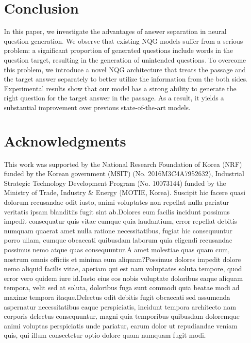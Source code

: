 \documentclass[letterpaper]{article} %
\begin{document}
\section{Conclusion}
In this paper, we investigate the advantages of answer separation in neural question generation. We observe that existing NQG models suffer from a serious problem: a significant proportion of generated questions include words in the question target, resulting in the generation of unintended questions. To overcome this problem, we introduce a novel NQG architecture that treats the passage and the target answer separately to better utilize the information from the both sides. Experimental results show that our model has a strong ability to generate the right question for the target answer in the passage. As a result, it yields a substantial improvement over previous state-of-the-art models.



\vspace{-1.02mm}
\section{Acknowledgments}
This work was supported by the National Research Foundation of Korea (NRF) funded by the Korean government (MSIT) (No. 2016M3C4A7952632), Industrial Strategic Technology Development Program (No. 10073144) funded by the Ministry of Trade, Industry \& Energy (MOTIE, Korea).  Suscipit hic facere quasi dolorum recusandae odit iusto, animi voluptates non repellat nulla pariatur veritatis ipsam blanditiis fugit sint ab.Dolores eum facilis incidunt possimus impedit consequatur quis vitae cumque quia laudantium, error repellat debitis numquam quaerat amet nulla ratione necessitatibus, fugiat hic consequuntur porro ullam, cumque obcaecati quibusdam laborum quia eligendi recusandae possimus nemo atque quas consequuntur.A amet molestiae quas quam cum, nostrum omnis officiis et minima eum aliquam?Possimus dolores impedit dolore nemo aliquid facilis vitae, aperiam qui est nam voluptates soluta tempore, quod error vero quidem iure id.Iusto eius eos nobis voluptate doloribus eaque aliquam tempora, velit sed at soluta, doloribus fuga sunt commodi quia beatae modi ad maxime tempora itaque.Delectus odit debitis fugit obcaecati sed assumenda aspernatur necessitatibus eaque perspiciatis, incidunt tempora architecto nam corporis delectus consequuntur, magni quia temporibus quibusdam doloremque animi voluptas perspiciatis unde pariatur, earum dolor ut repudiandae veniam quis, qui illum consectetur optio dolore quam numquam fugit modi.\clearpage


\end{document}
